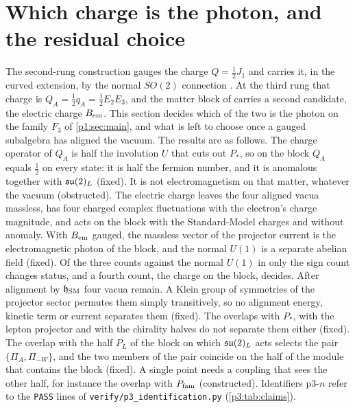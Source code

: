 \section{Which charge is the photon, and the residual choice}
\label{p3:sec:main}

The second-rung construction gauges the charge $Q=\tfrac12J_1$ and carries it, in the curved extension, by the normal $SO(2)$ connection
\cite[Thms.~26.7, 26.8]{ES17}. At the third rung that charge is $Q_A=\tfrac12q_A=\tfrac12E_2E_3$, and the matter block of \cite[Section~8]{ES17} carries a
second candidate, the electric charge $B_{\rm em}$. This section decides which of the two is the photon on the family $F_3$ of \cref{p1:sec:main}, and what is
left to choose once a gauged subalgebra has aligned the vacuum. The results are as follows. The charge operator of $Q_A$ is half the involution $U$ that cuts
out $P_*$, so on the block $Q_A$ equals $\tfrac12$ on every state: it is half the fermion number, and it is anomalous together with $\mathfrak{su}(2)_L$ (fixed). It is not
electromagnetism on that matter, whatever the vacuum (obstructed). The electric charge leaves the four aligned vacua massless, has four charged complex
fluctuations with the electron's charge magnitude, and acts on the block with the Standard-Model charges and without anomaly. With $B_{\rm em}$ gauged, the
massless vector of the projector current is the electromagnetic photon of the block, and the normal $U(1)$ is a separate abelian field (fixed). Of the three
counts against the normal $U(1)$ in \cite[Section~31]{ES17} only the sign count changes status, and a fourth count, the charge on the block, decides.
After alignment by $\mathfrak h_{\rm SM}$ four vacua remain. A Klein group of symmetries of the projector sector permutes them simply transitively, so no
alignment energy, kinetic term or current separates them (fixed). The overlaps with $P_*$, with the lepton projector and with the chirality halves do
not separate them either (fixed). The overlap with the half $P_L$ of the block on which $\mathfrak{su}(2)_L$ acts selects the pair $\{\Pi_A,\Pi_{-W}\}$, and the two
members of the pair coincide on the half of the module that contains the block (fixed). A single point needs a coupling that sees the other half, for
instance the overlap with $P_{\rm fam}$ (constructed). Identifiers p3-$n$ refer to the \texttt{PASS} lines of \texttt{verify/p3\_identification.py}
(\cref{p3:tab:claims}).

